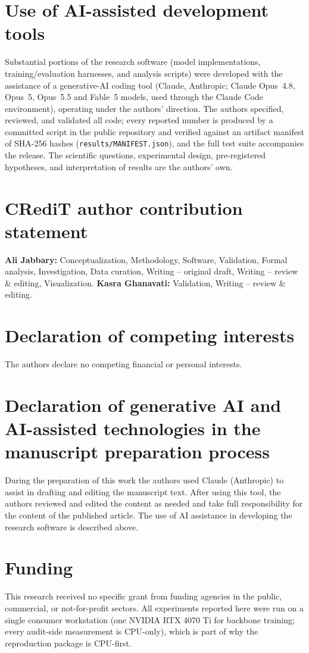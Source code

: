 \section*{Use of AI-assisted development tools}
Substantial portions of the research software (model implementations, training/evaluation
harnesses, and analysis scripts) were developed with the assistance of a generative-AI
coding tool (Claude, Anthropic; Claude Opus~4.8, Opus~5, Opus~5.5 and Fable~5 models, used
through the Claude Code environment), operating under the authors' direction. The authors specified,
reviewed, and validated all code; every reported number is produced by a committed script
in the public repository and verified against an artifact manifest of SHA-256 hashes
(\texttt{results\slash{}MANIFEST.json}), and the full test suite accompanies the release. The
scientific questions, experimental design, pre-registered hypotheses, and interpretation of
results are the authors' own.

\section*{CRediT author contribution statement}
\textbf{Ali Jabbary:} Conceptualization, Methodology, Software, Validation, Formal analysis,
Investigation, Data curation, Writing -- original draft, Writing -- review \& editing,
Visualization. \textbf{Kasra Ghanavati:} Validation, Writing -- review \& editing.

\section*{Declaration of competing interests}
The authors declare no competing financial or personal interests.

\section*{Declaration of generative AI and AI-assisted technologies in the manuscript
preparation process}
During the preparation of this work the authors used Claude (Anthropic) to assist in
drafting and editing the manuscript text. After using this tool, the authors reviewed and
edited the content as needed and take full responsibility for the content of the
published article. The use of AI assistance in developing the research software is
described above.

\section*{Funding}
This research received no specific grant from funding agencies in the public, commercial,
or not-for-profit sectors. All experiments reported here were run on a single consumer
workstation (one NVIDIA RTX 4070 Ti for backbone training; every audit-side measurement is
CPU-only), which is part of why the reproduction package is CPU-first.

